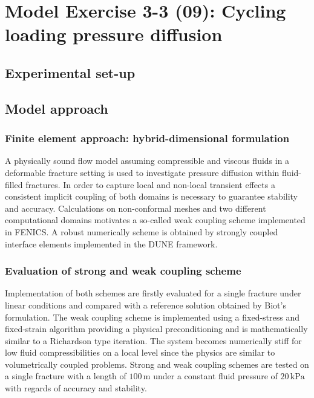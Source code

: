 \section{Model Exercise 3-3 (09): Cycling loading pressure diffusion}
\label{sec:mex09}
\subsection{Experimental set-up}
\subsection{Model approach}
\subsubsection*{Finite element approach: hybrid-dimensional formulation}
A physically sound flow model assuming compressible and viscous fluids in a deformable fracture setting is used to investigate pressure diffusion within fluid-filled fractures. In order to capture local and non-local transient effects a consistent implicit coupling of both domains is necessary to guarantee stability and accuracy. Calculations on non-conformal meshes and two different computational domains motivates a so-called weak coupling scheme implemented in FENICS. A robust numerically scheme is obtained by strongly coupled interface elements implemented in the DUNE framework. 
\subsubsection*{Evaluation of strong and weak coupling scheme}
Implementation of both schemes are firstly evaluated for a single fracture under linear conditions and compared with a reference solution obtained by Biot's formulation. The weak coupling scheme is implemented using a fixed-stress and fixed-strain algorithm providing a physical preconditioning and is mathematically similar to a Richardson type iteration. The system becomes numerically stiff for low fluid compressibilities on a local level since the physics are similar to volumetrically coupled problems. Strong and weak coupling schemes are tested on a single fracture with a length of $100 \, \text{m}$ under a constant fluid pressure of $20 \, \text{kPa}$ with regards of accuracy and stability. 

